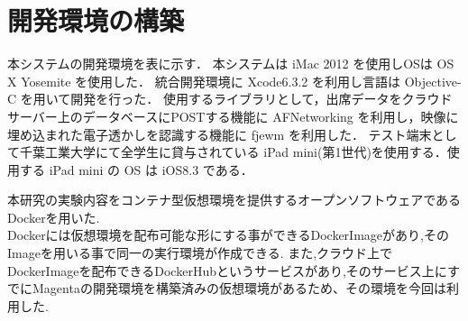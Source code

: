 \section{開発環境の構築}
本システムの開発環境を表に示す．
本システムは iMac 2012 を使用しOSは OS X Yosemite を使用した．
統合開発環境に Xcode6.3.2 を利用し言語は Objective-C を用いて開発を行った．
使用するライブラリとして，出席データをクラウドサーバー上のデータベースにPOSTする機能に AFNetworking を利用し，映像に埋め込まれた電子透かしを認識する機能に fjewm を利用した．
テスト端末として千葉工業大学にて全学生に貸与されている iPad mini(第1世代)を使用する．使用する iPad mini の OS は iOS8.3 である．

本研究の実験内容をコンテナ型仮想環境を提供するオープンソフトウェアであるDockerを用いた.\\
Dockerには仮想環境を配布可能な形にする事ができるDockerImageがあり,そのImageを用いる事で同一の実行環境が作成できる.
また,クラウド上でDockerImageを配布できるDockerHubというサービスがあり,そのサービス上にすでにMagentaの開発環境を構築済みの仮想環境があるため、その環境を今回は利用した.